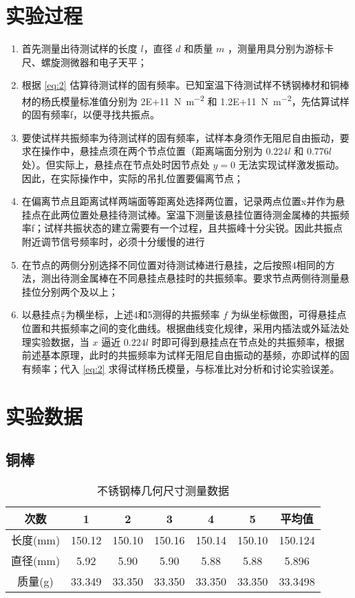 \documentclass[a4paper,utf8]{article}
\begin{document}
\section{实验过程}%
    \begin{enumerate}
        \item 首先测量出待测试样的长度 $l$，直径 $d$ 和质量 $m$ ，测量用具分别为游标卡尺、螺旋测微器和电子天平；
        \item 根据 \eqref{eq:2} 估算待测试样的固有频率。已知室温下待测试样不锈钢棒材和铜棒材的杨氏模量标准值分别为 \SI{2E+11}{\N\per\m^2} 和 \SI{1.2E+11}{\N\per\m^2}，先估算试样的固有频率f，以便寻找共振点。
        \item 要使试样共振频率为待测试样的固有频率，试样本身须作无阻尼自由振动，要求在操作中，悬挂点须在两个节点位置（距离端面分别为 $0.224l$ 和 $0.776l$ 处）。但实际上，悬挂点在节点处时因节点处 $y=0$ 无法实现试样激发振动。因此，在实际操作中，实际的吊扎位置要偏离节点；
        \item 在偏离节点且距离试样两端面等距离处选择两位置，记录两点位置x并作为悬挂点在此两位置处悬挂待测试棒。室温下测量该悬挂位置待测金属棒的共振频率f；试样共振状态的建立需要有一个过程，且共振峰十分尖锐。因此共振点附近调节信号频率时，必须十分缓慢的进行
        \item 在节点的两侧分别选择不同位置对待测试棒进行悬挂，之后按照4相同的方法，测出待测金属棒在不同悬挂点悬挂时的共振频率。要求节点两侧待测量悬挂位分别两个及以上；
        \item 以悬挂点$\frac{x}{l}$为横坐标，上述4和5测得的共振频率 $f$ 为纵坐标做图，可得悬挂点位置和共振频率之间的变化曲线。根据曲线变化规律，采用内插法或外延法处理实验数据，当 $x$ 逼近 $0.224l$ 时即可得到悬挂点在节点处的共振频率，根据前述基本原理，此时的共振频率为试样无阻尼自由振动的基频，亦即试样的固有频率；代入 \eqref{eq:2} 求得试样杨氏模量，与标准比对分析和讨论实验误差。 
    \end{enumerate}

\section{实验数据}
\subsection{铜棒}

\begin{table}[!ht]
    \caption{不锈钢棒几何尺寸测量数据}\label{tab:copperSize}
    \begin{tabular}{c *{5}{S[table-format=3.3]} S[table-format=3.4]} \toprule
        次数 & {1} & {2} & {3} & {4} & {5} & {平均值}  \\ \midrule
        长度(\unit{\mm}) & 150.12 & 150.10 & 150.16 & 150.14 & 150.10 & 150.124 \\ 
        直径(\unit{\mm}) & 5.92 & 5.90  & 5.90 & 5.88 & 5.88 & 5.896 \\ 
        质量(\unit{\g}) & 33.349 & 33.350 & 33.350 & 33.350 & 33.350 & 33.3498 \\ \bottomrule
    \end{tabular}
\end{table}
\end{document}
